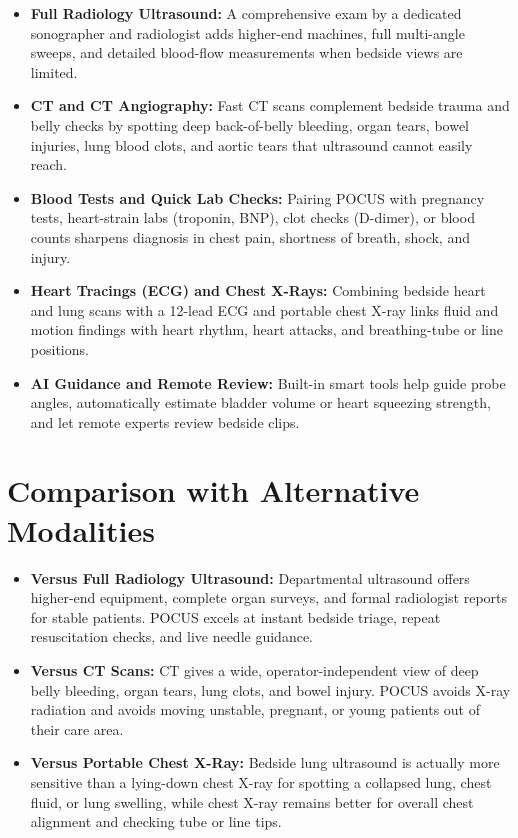 \begin{itemize}
    \item \textbf{Full Radiology Ultrasound:} A comprehensive exam by a dedicated sonographer and radiologist adds higher-end machines, full multi-angle sweeps, and detailed blood-flow measurements when bedside views are limited.
    \item \textbf{CT and CT Angiography:} Fast CT scans complement bedside trauma and belly checks by spotting deep back-of-belly bleeding, organ tears, bowel injuries, lung blood clots, and aortic tears that ultrasound cannot easily reach.
    \item \textbf{Blood Tests and Quick Lab Checks:} Pairing POCUS with pregnancy tests, heart-strain labs (troponin, BNP), clot checks (D-dimer), or blood counts sharpens diagnosis in chest pain, shortness of breath, shock, and injury.
    \item \textbf{Heart Tracings (ECG) and Chest X-Rays:} Combining bedside heart and lung scans with a 12-lead ECG and portable chest X-ray links fluid and motion findings with heart rhythm, heart attacks, and breathing-tube or line positions.
    \item \textbf{AI Guidance and Remote Review:} Built-in smart tools help guide probe angles, automatically estimate bladder volume or heart squeezing strength, and let remote experts review bedside clips.
\end{itemize}

\section{Comparison with Alternative Modalities}

\begin{itemize}
    \item \textbf{Versus Full Radiology Ultrasound:} Departmental ultrasound offers higher-end equipment, complete organ surveys, and formal radiologist reports for stable patients. POCUS excels at instant bedside triage, repeat resuscitation checks, and live needle guidance.
    \item \textbf{Versus CT Scans:} CT gives a wide, operator-independent view of deep belly bleeding, organ tears, lung clots, and bowel injury. POCUS avoids X-ray radiation and avoids moving unstable, pregnant, or young patients out of their care area.
    \item \textbf{Versus Portable Chest X-Ray:} Bedside lung ultrasound is actually more sensitive than a lying-down chest X-ray for spotting a collapsed lung, chest fluid, or lung swelling, while chest X-ray remains better for overall chest alignment and checking tube or line tips.
\end{itemize}

